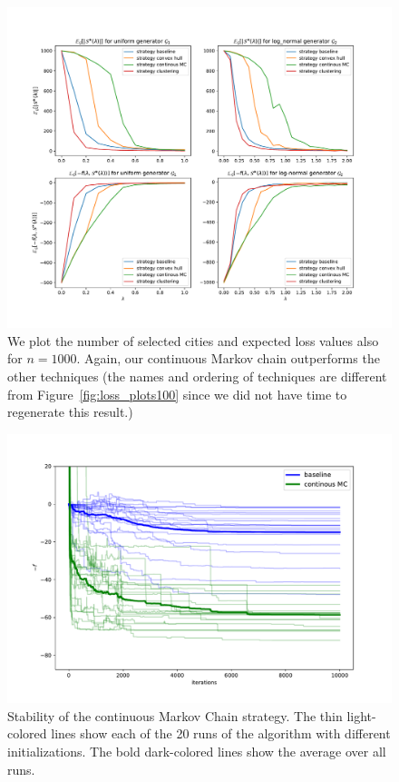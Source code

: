 \documentclass[conference,compsoc]{IEEEtran}
\begin{document}
\begin{figure}
    \centering
    \includegraphics[width=\linewidth, trim=55 55 55 55, clip]{images/Expectation_f_num_cities_1000.pdf}
    \caption{We plot the number of selected cities and expected loss values also
    for $n=1000$. Again, our continuous Markov chain outperforms the other
    techniques (the names and ordering of techniques are different from
    Figure~\ref{fig:loss_plots100} since we did not have time to regenerate this
    result.)}
    \label{fig:loss_plots}
\end{figure}

\begin{figure}
    \centering
    \includegraphics[width=\linewidth]{images/stability.pdf}
    \caption{Stability of the continuous Markov Chain strategy. The thin
    light-colored lines show each of the 20 runs of the algorithm with different
    initializations. The bold dark-colored lines show the average over all
    runs.}
    \label{fig:stability}
\end{figure}
\end{document}
